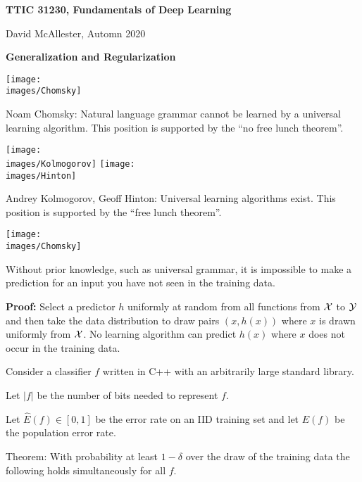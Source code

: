 





{\Huge


\centerline{\bf TTIC 31230, Fundamentals of Deep Learning}
\bigskip
\centerline{David McAllester, Automn 2020}

\vfill
\centerline{\bf Generalization and Regularization}
\vfill
\vfill


\texttt{[image: \\images/Chomsky]} \begin{minipage}[b]{8in} Noam Chomsky: 
Natural language grammar cannot be learned by a universal learning algorithm.
This position is supported by the ``no free lunch theorem''.\end{minipage}

\vfill
\texttt{[image: \\images/Kolmogorov]}
\texttt{[image: \\images/Hinton]}
\begin{minipage}[b]{7in}
Andrey Kolmogorov, Geoff Hinton: Universal learning algorithms exist. This position is supported by the ``free lunch theorem''.
\end{minipage}


\texttt{[image: \\images/Chomsky]} 

Without prior knowledge, such as universal grammar, it is impossible to make a prediction for an input you have not seen in the training data.


\vfill
{\bf Proof:} Select a predictor $h$ uniformly at random from all functions from ${\cal X}$ to ${\cal Y}$ and then take the data distribution to draw pairs $(x, h(x))$
where $x$ is drawn uniformly from ${\cal X}$.  No learning algorithm can predict $h(x)$ where $x$ does not occur in the training data.



Consider a classifier $f$ written in C++ with an arbitrarily large standard library.

\vfill
Let $|f|$ be the number of bits needed to represent $f$.

\vfill
Let $\hat{E}(f) \in [0,1]$ be the error rate on an IID training set and let $E(f)$ be the population error rate.

\vfill
Theorem: With probability at least $1-\delta$ over the draw of the training data the following holds simultaneously for all $f$.

}
